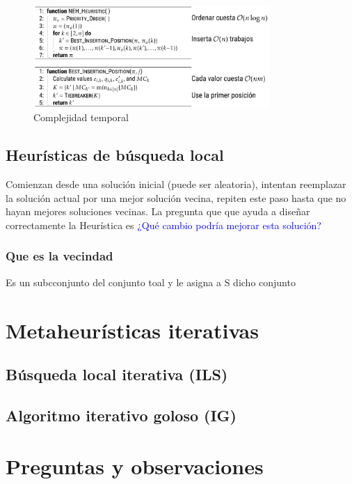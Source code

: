 \documentclass[10pt, a4paper]{article}
\begin{document}
\begin{figure}[H]
  \centering
  \includegraphics[width=0.8\textwidth]{./.github/1733417790.png}
  \caption{Complejidad temporal}\label{fig:time-complexity}
\end{figure}

\subsection{Heurísticas de búsqueda local}\label{sec:local-search-heuristic}

Comienzan desde una solución inicial (puede ser aleatoria), intentan reemplazar 
la solución actual por una mejor solución vecina, repiten este paso hasta que 
no hayan mejores soluciones vecinas. La pregunta que que ayuda a diseñar 
correctamente la Heurística es \textcolor{blue}{¿Qué cambio podría mejorar 
esta solución?}


\subsubsection{Que es la vecindad}

Es un subcconjunto del conjunto toal y le asigna a S dicho conjunto

\section{Metaheurísticas iterativas}\label{sec:iterative-heuristics}

\subsection{Búsqueda local iterativa (ILS)}\label{sec:iterative-lineal-search}

\subsection{Algoritmo iterativo goloso (IG)}\label{sec:greedy-iterative-algorithm}


\section{Preguntas y observaciones}\label{sec:questions-and-obsertation}
\end{document}

